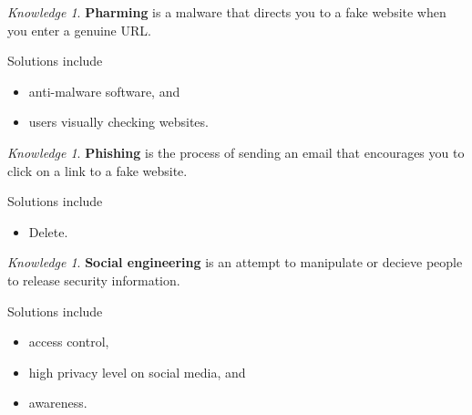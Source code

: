 \documentclass[8pt]{article}
\theoremstyle{remark}
\newtheorem{knowledge}[method]{Knowledge}
\begin{document}
            \begin{knowledge}
                \textbf{Pharming} is a malware that directs you to a fake website when you enter a genuine URL.

                Solutions include
                \begin{itemize}
                    \item anti-malware software, and
                    \item users visually checking websites.
                \end{itemize}
            \end{knowledge}

            \begin{knowledge}
                \textbf{Phishing} is the process of sending an email that encourages you to click on a link to a fake website.

                Solutions include
                \begin{itemize}
                    \item Delete.
                \end{itemize}
            \end{knowledge}

            \begin{knowledge}
                \textbf{Social engineering} is an attempt to manipulate or decieve people to release security information.

                Solutions include
                \begin{itemize}
                    \item access control,
                    \item high privacy level on social media, and
                    \item awareness.
                \end{itemize}
            \end{knowledge}
\end{document}
